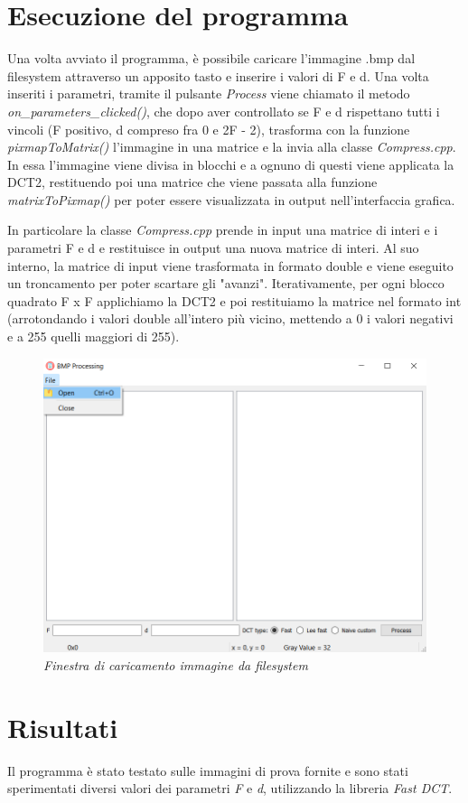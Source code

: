 \documentclass[a4paper,12pt]{report}
\begin{document}
\section{Esecuzione del programma}
Una volta avviato il programma, è possibile caricare l'immagine .bmp dal filesystem attraverso un apposito tasto e inserire i valori di F e d. Una volta inseriti i parametri, tramite il pulsante \textit{Process} viene chiamato il metodo \textit{on\_parameters\_clicked()}, che dopo aver controllato se F e d rispettano tutti i vincoli (F positivo, d compreso fra 0 e 2F - 2), trasforma con la funzione \textit{pixmapToMatrix()} l'immagine in una matrice e la invia alla classe \textit{Compress.cpp}. In essa l'immagine viene divisa in blocchi e a ognuno di questi viene applicata la DCT2, restituendo poi una matrice che viene passata alla funzione \textit{matrixToPixmap()} per poter essere visualizzata in output nell'interfaccia grafica.
\bigskip

\noindent In particolare la classe \textit{Compress.cpp} prende in input una matrice di interi e i parametri F e d e restituisce in output una nuova matrice di interi. Al suo interno, la matrice di input viene trasformata in formato double e viene eseguito un troncamento per poter scartare gli "avanzi". Iterativamente, per ogni blocco quadrato F x F applichiamo la DCT2 e poi restituiamo la matrice nel formato int (arrotondando i valori double all'intero più vicino, mettendo a 0 i valori negativi e a 255 quelli maggiori di 255). 

\begin{figure}[H]
\centering
\includegraphics[width=0.7\linewidth]{../img/open.png}
\caption{\textit{Finestra di caricamento immagine da filesystem}}
\end{figure}

\newpage
\section{Risultati}
Il programma è stato testato sulle immagini di prova fornite e sono stati sperimentati diversi valori dei parametri \textit{F} e \textit{d}, utilizzando la libreria \textit{Fast DCT}.
\end{document}
